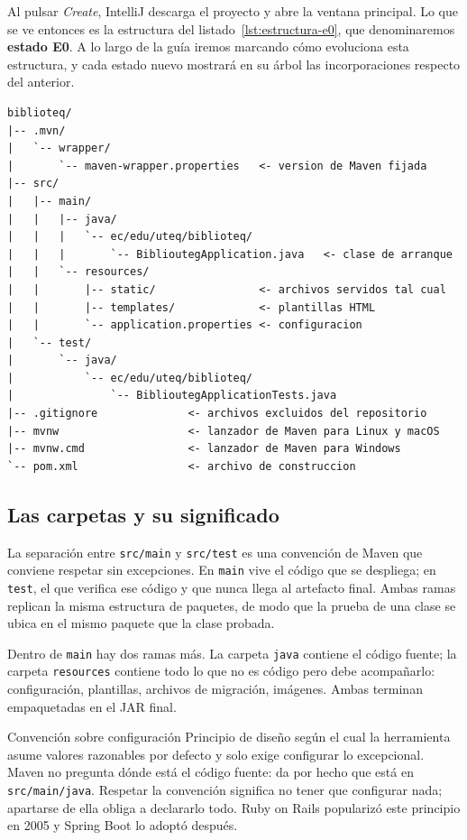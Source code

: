 \documentclass[11pt,a4paper,openany]{book}
\begin{document}
Al pulsar \emph{Create}, IntelliJ descarga el proyecto y abre la ventana principal. Lo que se ve entonces es la estructura del listado~\ref{lst:estructura-e0}, que denominaremos \textbf{estado E0}. A lo largo de la guía iremos marcando cómo evoluciona esta estructura, y cada estado nuevo mostrará en su árbol las incorporaciones respecto del anterior.

\begin{lstlisting}[style=plano,caption={Estado E0 --- estructura recien generada por Spring Initializr.},label={lst:estructura-e0}]
biblioteq/
|-- .mvn/
|   `-- wrapper/
|       `-- maven-wrapper.properties   <- version de Maven fijada
|-- src/
|   |-- main/
|   |   |-- java/
|   |   |   `-- ec/edu/uteq/biblioteq/
|   |   |       `-- BiblioutegApplication.java   <- clase de arranque
|   |   `-- resources/
|   |       |-- static/                <- archivos servidos tal cual
|   |       |-- templates/             <- plantillas HTML
|   |       `-- application.properties <- configuracion
|   `-- test/
|       `-- java/
|           `-- ec/edu/uteq/biblioteq/
|               `-- BiblioutegApplicationTests.java
|-- .gitignore              <- archivos excluidos del repositorio
|-- mvnw                    <- lanzador de Maven para Linux y macOS
|-- mvnw.cmd                <- lanzador de Maven para Windows
`-- pom.xml                 <- archivo de construccion
\end{lstlisting}

\subsection{Las carpetas y su significado}
\label{sec:carpetas}

La separación entre \texttt{src/main} y \texttt{src/test} es una convención de Maven que conviene respetar sin excepciones. En \texttt{main} vive el código que se despliega; en \texttt{test}, el que verifica ese código y que nunca llega al artefacto final. Ambas ramas replican la misma estructura de paquetes, de modo que la prueba de una clase se ubica en el mismo paquete que la clase probada.

Dentro de \texttt{main} hay dos ramas más. La carpeta \texttt{java} contiene el código fuente; la carpeta \texttt{resources} contiene todo lo que no es código pero debe acompañarlo: configuración, plantillas, archivos de migración, imágenes. Ambas terminan empaquetadas en el JAR final.

\begin{cajadefinicion}{Convención sobre configuración}
	Principio de diseño según el cual la herramienta asume valores razonables por defecto y solo exige configurar lo excepcional. Maven no pregunta dónde está el código fuente: da por hecho que está en \texttt{src/main/java}. Respetar la convención significa no tener que configurar nada; apartarse de ella obliga a declararlo todo. Ruby on Rails popularizó este principio en 2005 y Spring Boot lo adoptó después.
\end{cajadefinicion}
\end{document}
